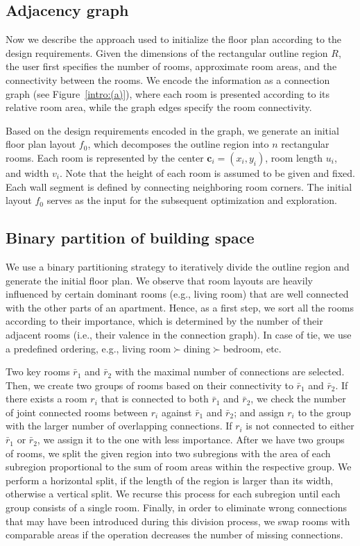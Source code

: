 \subsection{Adjacency graph}

Now we describe the approach used to initialize the floor plan according to the design requirements. Given the dimensions of the rectangular outline region $R$, the user first specifies the number of rooms, approximate room areas, and the connectivity between the rooms. We encode the information as a connection graph (see Figure~\ref{intro:(a)}), where each room is presented according to its relative room area, while the graph edges specify the room connectivity.

Based on the design requirements encoded in the graph, we generate an initial floor plan layout $f_0$, which decomposes the outline region into $n$ rectangular rooms.
Each room is represented by the center $\mathbf{c}_i=(x_i, y_i)$, room length $u_i$, and width $v_i$. Note that the height of each room is assumed to be given and fixed. Each wall segment is defined by connecting neighboring room corners.
The initial layout $f_0$ serves as the input for the subsequent optimization and exploration.

\subsection{Binary partition of building space}

We use a binary partitioning strategy to iteratively divide the outline region and generate the initial floor plan. We observe that room layouts are heavily influenced by certain dominant rooms (e.g., living room) that are well connected with the other parts of an apartment. Hence, as a first step, we sort all the rooms according to their importance, which is determined by the number of their adjacent rooms (i.e., their valence in the connection graph). In case of tie, we use a predefined ordering, e.g., living room$\succ$dining$\succ$bedroom, etc.

Two key rooms $\bar{r}_1$ and $\bar{r}_2$ with the maximal number of connections are selected. Then, we create two groups of rooms based on their connectivity to $\bar{r}_1$ and $\bar{r}_2$.
%
If there exists a room $r_i$ that is connected to both $\bar{r}_1$ and $\bar{r}_2$, we check the number of joint connected rooms between $r_i$ against $\bar{r}_1$ and $\bar{r}_2$; and assign $r_i$ to the group with the larger number of overlapping connections.
If $r_i$ is not connected to either $\bar{r}_1$ or $\bar{r}_2$, we assign it to the one with less importance. After we have two groups of rooms, we split the given region into two subregions with the area of each subregion proportional to the sum of room areas within the respective group.
%
We perform a horizontal split, if the length of the region is larger than its width, otherwise a vertical split. We recurse this process for each subregion until each group consists of a single room.
%
Finally, in order to eliminate wrong connections that may have been introduced during this division process, we swap rooms with comparable areas if the operation decreases the number of missing connections.

